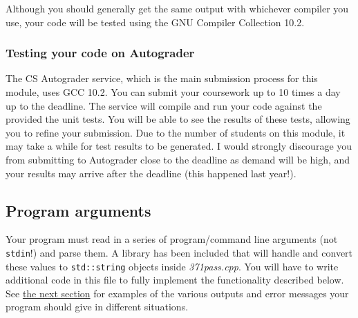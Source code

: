 \documentclass[a4paper]{article}
\begin{document}
Although you should generally get the same output with whichever compiler you use, your code will be tested using the GNU Compiler Collection 10.2.

\subsubsection*{Testing your code on Autograder}
The CS Autograder service, which is the main submission process for this module, uses GCC 10.2. You can submit your coursework up to 10 times a day up to the deadline. The service will compile and run your code against the provided the unit tests. You will be able to see the results of these tests, allowing you to refine your submission. Due to the number of students on this module, it may take a while for test results to be generated. I would strongly discourage you from submitting to Autograder close to the deadline as demand will be high, and your results may arrive after the deadline (this happened last year!).



\subsection*{Program arguments}\label{sec:cwk args}
Your program must read in a series of program/command line arguments (not \texttt{stdin}!) and parse them. A library has been included that will handle and convert these values to \texttt{std::string} objects inside \emph{371pass.cpp}. You will have to write additional code in this file to fully implement the functionality described below. See \hyperref[sec:cwk outputs]{the next section} for examples of the various outputs and error messages your program should give in different situations. 
\end{document}
